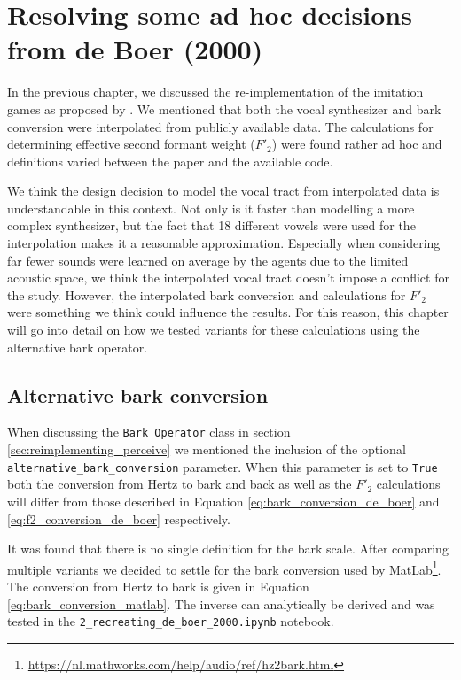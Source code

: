 \chapter{Resolving some ad hoc decisions from de Boer (2000)}
\label{ch:improving_de_boer}

In the previous chapter, we discussed the re-implementation of the imitation games as proposed by \citet{deBoer2000}.
We mentioned that both the vocal synthesizer and bark conversion were interpolated from publicly available data.
The calculations for determining effective second formant weight ($F'_2$) were found rather ad hoc and definitions varied between the paper and the available code.

We think the design decision to model the vocal tract from interpolated data is understandable in this context.
Not only is it faster than modelling a more complex synthesizer, but the fact that 18 different vowels were used for the interpolation makes it a reasonable approximation.
Especially when considering far fewer sounds were learned on average by the agents due to the limited acoustic space, we think the interpolated vocal tract doesn't impose a conflict for the study.
However, the interpolated bark conversion and calculations for $F'_2$ were something we think could influence the results.
For this reason, this chapter will go into detail on how we tested variants for these calculations using the alternative bark operator.


\section{Alternative bark conversion}
\label{sec:alternative_bark_conversion}

When discussing the \texttt{Bark Operator} class in section \ref{sec:reimplementing_perceive} we mentioned the inclusion of the optional \texttt{alternative\_bark\_conversion} parameter.
When this parameter is set to \texttt{True} both the conversion from Hertz to bark and back as well as the $F'_2$ calculations will differ from those described in Equation \ref{eq:bark_conversion_de_boer} and \ref{eq:f2_conversion_de_boer} respectively.

It was found that there is no single definition for the bark scale.
After comparing multiple variants we decided to settle for the bark conversion used by MatLab\footnote{\url{https://nl.mathworks.com/help/audio/ref/hz2bark.html}}.
The conversion from Hertz to bark is given in Equation \ref{eq:bark_conversion_matlab}.
The inverse can analytically be derived and was tested in the \texttt{2\_recreating\_de\_boer\_2000.ipynb} notebook.

